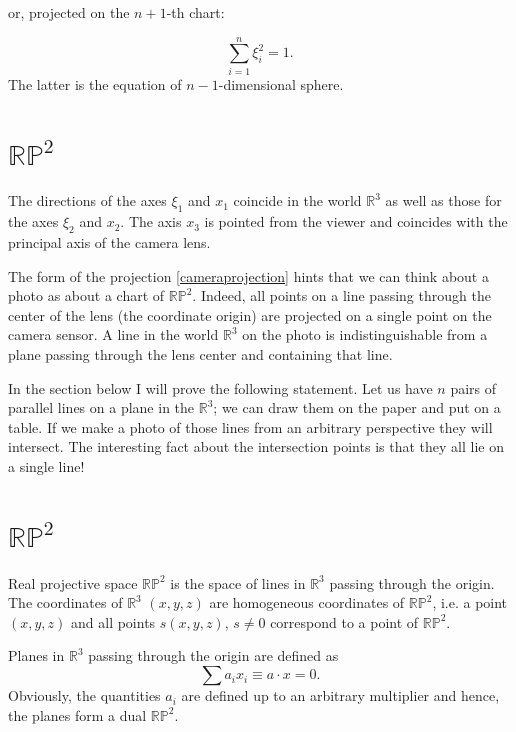 \documentclass[a4paper,10pt]{article}
\begin{document}
or, projected on the $n+1$-th chart:

\begin{equation}
\sum\limits_{i=1}^n \xi_i^2  = 1.
\end{equation}
The latter is the equation of $n-1$-dimensional sphere.





\section{$\mathbb{RP}^2$}


The directions of the axes $\xi_1$ and $x_1$ coincide in the world $\mathbb{R}^3$ as well as those for the axes  $\xi_2$ and $x_2$. The axis $x_3$ is pointed from the viewer and coincides with the principal axis of the camera lens. 

The form of the projection \eqref{cameraprojection} hints that we can think about a photo as about a chart of $\mathbb{RP}^2$. Indeed, all points on a line passing through the center of the lens (the coordinate origin) are projected on a single point on the camera sensor. A line in the world $\mathbb{R}^3$ on the photo is indistinguishable from a plane passing through the lens center and containing that line.  

In the section below I will prove the following statement. Let us have $n$ pairs of parallel lines on a plane in the $\mathbb{R}^3$; we can draw them on the paper and put on a table. If we make a photo of those lines from an arbitrary perspective they will intersect. The interesting fact about  the intersection points is that they all lie on a single line!

\section{$\mathbb{RP}^2$ }
 Real projective space $\mathbb{RP}^2$ is the space of lines in $\mathbb{R}^{3}$ passing through the origin. The coordinates of $\mathbb{R}^3$ $(x,y,z)$ are homogeneous coordinates of $\mathbb{RP}^2$, i.e. a point $(x,y,z)$ and all points $s(x,y,z)$, $s\neq 0$ correspond to a point of $\mathbb{RP}^2$.  

Planes in $\mathbb{R}^3$ passing through the origin are defined as 
\begin{equation}
\sum a_i x_i \equiv a\cdot x= 0.
\end{equation}
 Obviously, the quantities $a_i$ are defined up to an arbitrary multiplier and hence, the planes form a dual $\mathbb{RP}^2$. 
 
\end{document}
